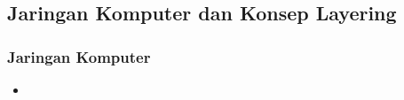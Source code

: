 \documentclass[pdflatex,compress]{beamer}
\begin{document}
\subsection{Jaringan Komputer dan Konsep Layering}

\begin{frame}
	\frametitle{Jaringan Komputer}
	\begin{itemize}
		\item 
	\end{itemize}
\end{frame}
\end{document}

